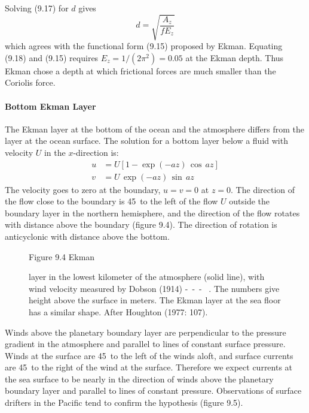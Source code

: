 Solving (9.17) for $d$ gives
\begin{equation}
d = \sqrt{\frac{A_z}{fE_z}}
\end{equation}
which agrees with the functional form (9.15) proposed by Ekman. Equating (9.18)
and (9.15) requires $E_z = 1/(2\pi^2) = 0.05$ at the Ekman depth. Thus Ekman chose
a depth at which frictional forces are much smaller than the Coriolis force.

\paragraph{Bottom Ekman Layer}
The Ekman layer at the bottom of the ocean and the atmosphere differs from the layer at the
ocean surface. The solution for a bottom layer below a fluid with velocity $U$ in the $x$-direction is:
\begin{subequations}
\begin{align}
u&=U[1 - \exp(-az)\,\cos\,az]  \\
v&=U\,\exp(-az)\,\sin\,az
\end{align}
\end{subequations}
The velocity goes to zero at the boundary, $u = v = 0$ at $z = 0$. The direction
of the flow close to the boundary is 45\degrees\ to the left of the flow $U$
outside the boundary layer in the northern hemisphere, and the direction of the
flow rotates with distance above the boundary (figure 9.4). The direction of
rotation is anti\-cyclonic with distance above the bottom.

\begin{figure}[b!]
\footnotesize
Figure 9.4 Ekman  \rule{0mm}{3ex}layer in the lowest kilometer of
the atmosphere (solid line), with wind velocity measured by Dobson
(1914) -\ -\ - \ . The numbers give height above the surface in meters. The
Ekman layer at the sea floor has a similar shape. After Houghton
(1977: 107).
\label{fig:bottomekman}
\end{figure}

Winds above the planetary boundary layer are perpendicular to the pressure
gradient in the atmosphere and parallel to lines of constant surface pressure.
Winds at the surface are 45\degrees\ to the left of the winds aloft, and surface
currents are 45\degrees\ to the right of the wind at the surface. Therefore we
expect currents at the sea surface to be nearly in the direction of winds
above the planetary boundary layer and parallel to lines of constant
pressure. Observations of surface drifters in the Pacific tend to
confirm the hypothesis (figure 9.5).

